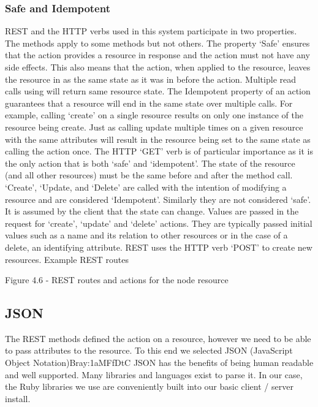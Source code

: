 \subsubsection{Safe and Idempotent}
      REST and the HTTP verbs used in this system participate in two properties. The methods apply to some methods but not others.  The property ‘Safe’ ensures that the action provides a resource in response and the action must not have any side effects. This also means that the action, when applied to the resource, leaves the resource in as the same state as it was in before the action.  Multiple read calls using will return same resource state.  
      The Idempotent property of an action guarantees that a resource will end in the same state over multiple calls. For example, calling ‘create’ on a single resource results on only one instance of the resource being create.  Just as calling update multiple times on a given resource with the same attributes will result in the resource being set to the same state as calling the action once.  The HTTP ‘GET’ verb is of particular importance as it is the only action that is both ‘safe’ and ‘idempotent’.  
      The state of the resource (and all other resources) must be the same before and after the method call.  ‘Create’, ‘Update, and ‘Delete’ are called with the intention of modifying a resource and are considered ‘Idempotent’.  Similarly they are not considered ‘safe’.  It is assumed by the client that the state can change.  
       Values are passed in the request for ‘create’, ‘update’ and ‘delete’ actions.  They are typically passed initial values such as a name and its relation to other resources or in the case of a delete, an identifying attribute.  REST uses the HTTP verb ‘POST’ to create new resources.  
       Example REST routes
        
        Figure 4.6 - REST routes and actions for the node resource
\subsection{JSON}
        The REST methods defined the action on a resource, however we need to be able to pass attributes to the resource. To this end we selected JSON (JavaScript Object Notation){Bray:1aMFfDtC} JSON has the benefits of being human readable and well supported. Many libraries and languages exist to parse it. In our case, the Ruby libraries we use are conveniently built into our basic client / server install.  





